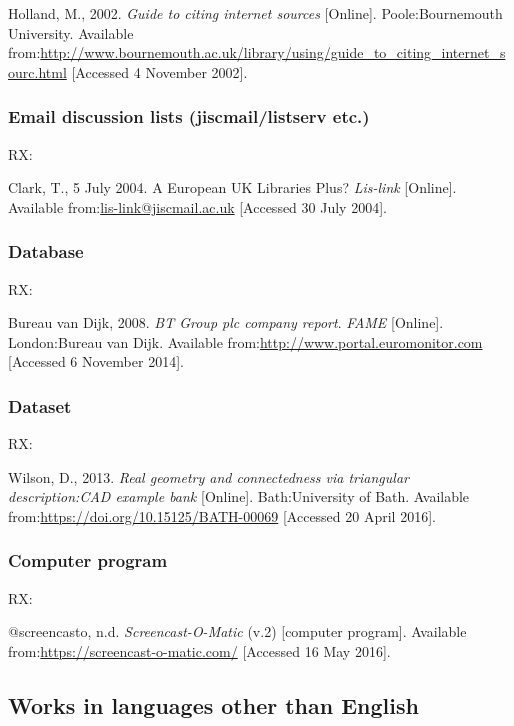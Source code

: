 Holland, M., 2002. \emph{Guide to citing internet sources} [Online]. Poole:\@ Bournemouth University. Available from:\@ \url{http://www.bournemouth.ac.uk/library/using/guide_to_citing_internet_sourc.html} [Accessed 4 November 2002].



\subsubsection*{Email discussion lists (jiscmail\slash listserv etc.)}

RX: \cite{clark2004euk}

Clark, T., 5 July 2004. A European UK Libraries Plus? \emph{Lis-link} [Online]. Available from:\@ \url{lis-link@jiscmail.ac.uk} [Accessed 30 July 2004].



\subsubsection*{Database}

RX: \cite{bvd2008bt}

Bureau van Dijk, 2008. \emph{BT Group plc company report}. \emph{FAME} [Online]. London:\@ Bureau van Dijk. Available from:\@ \url{http://www.portal.euromonitor.com} [Accessed 6 November 2014].



\subsubsection*{Dataset}

RX: \cite{wilson2013rgc}

Wilson, D., 2013. \emph{Real geometry and connectedness via triangular description:\@ CAD example bank} [Online]. Bath:\@ University of Bath. Available from:\@ \url{https://doi.org/10.15125/BATH-00069} [Accessed 20 April 2016].



\subsubsection*{Computer program}

RX: \cite{screencasto}

@screencasto, n.d. \emph{Screencast-O-Matic} (v.2) [computer program]. Available from:\@ \url{https://screencast-o-matic.com/} [Accessed 16 May 2016].



\subsection{Works in languages other than English}

